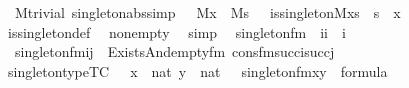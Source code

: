 \begin{isabellebody}
\isanewline
{}\isamarkupfalse%
\ {\isacharparenleft}{\kern0pt}\ M{\isacharunderscore}{\kern0pt}trivial{\isacharparenright}{\kern0pt}\ singleton{\isacharunderscore}{\kern0pt}abs{\isacharbrackleft}{\kern0pt}simp{\isacharbrackright}{\kern0pt}\ {\isacharcolon}{\kern0pt}\ {\isachardoublequoteopen}{\isasymlbrakk}\ M{\isacharparenleft}{\kern0pt}x{\isacharparenright}{\kern0pt}\ {\isacharsemicolon}{\kern0pt}\ M{\isacharparenleft}{\kern0pt}s{\isacharparenright}{\kern0pt}\ {\isasymrbrakk}\ {\isasymLongrightarrow}\ is{\isacharunderscore}{\kern0pt}singleton{\isacharparenleft}{\kern0pt}M{\isacharcomma}{\kern0pt}x{\isacharcomma}{\kern0pt}s{\isacharparenright}{\kern0pt}\ {\isasymlongleftrightarrow}\ s\ {\isacharequal}{\kern0pt}\ {\isacharbraceleft}{\kern0pt}x{\isacharbraceright}{\kern0pt}{\isachardoublequoteclose}\isanewline
%
\isadelimproof
\ \ %
\endisadelimproof
%
\isatagproof
{}\isamarkupfalse%
\ is{\isacharunderscore}{\kern0pt}singleton{\isacharunderscore}{\kern0pt}def\ \isamarkupfalse%
\ nonempty\ \isamarkupfalse%
\ simp%
\endisatagproof
{\isafoldproof}%
%
\isadelimproof
\isanewline
%
\endisadelimproof
\isanewline
{}\isamarkupfalse%
\isanewline
\ \ singleton{\isacharunderscore}{\kern0pt}fm\ {\isacharcolon}{\kern0pt}{\isacharcolon}{\kern0pt}\ {\isachardoublequoteopen}{\isacharbrackleft}{\kern0pt}i{\isacharcomma}{\kern0pt}i{\isacharbrackright}{\kern0pt}\ {\isasymRightarrow}\ i{\isachardoublequoteclose}\ \isanewline
\ \ {\isachardoublequoteopen}singleton{\isacharunderscore}{\kern0pt}fm{\isacharparenleft}{\kern0pt}i{\isacharcomma}{\kern0pt}j{\isacharparenright}{\kern0pt}\ {\isasymequiv}\ Exists{\isacharparenleft}{\kern0pt}And{\isacharparenleft}{\kern0pt}empty{\isacharunderscore}{\kern0pt}fm{\isacharparenleft}{\kern0pt}{}{\isacharparenright}{\kern0pt}{\isacharcomma}{\kern0pt}\ cons{\isacharunderscore}{\kern0pt}fm{\isacharparenleft}{\kern0pt}succ{\isacharparenleft}{\kern0pt}i{\isacharparenright}{\kern0pt}{\isacharcomma}{\kern0pt}{}{\isacharcomma}{\kern0pt}succ{\isacharparenleft}{\kern0pt}j{\isacharparenright}{\kern0pt}{\isacharparenright}{\kern0pt}{\isacharparenright}{\kern0pt}{\isacharparenright}{\kern0pt}{\isachardoublequoteclose}\isanewline
\isanewline
{}\isamarkupfalse%
\ singleton{\isacharunderscore}{\kern0pt}type{\isacharbrackleft}{\kern0pt}TC{\isacharbrackright}{\kern0pt}\ {\isacharcolon}{\kern0pt}\ {\isachardoublequoteopen}{\isasymlbrakk}\ x\ {\isasymin}\ nat{\isacharsemicolon}{\kern0pt}\ y\ {\isasymin}\ nat\ {\isasymrbrakk}\ {\isasymLongrightarrow}\ singleton{\isacharunderscore}{\kern0pt}fm{\isacharparenleft}{\kern0pt}x{\isacharcomma}{\kern0pt}y{\isacharparenright}{\kern0pt}\ {\isasymin}\ formula{\isachardoublequoteclose}\isanewline

\end{isabellebody}
